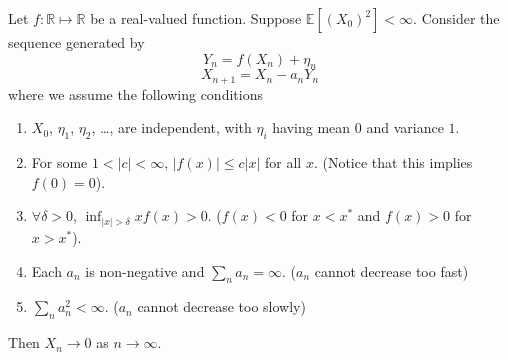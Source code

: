     \begin{theorem}\label{Thm:StochasticApproximation}
        Let $f: \mathbb{R} \mapsto \mathbb{R}$ be a real-valued function. Suppose $\mathbb{E}[(X_0)^2] < \infty$. Consider the sequence generated by
        \[ Y_n = f(X_n) + \eta_n \]
        \[ X_{n+1} = X_n - a_n Y_n \]
        where we assume the following conditions
        \begin{enumerate}
            \item $X_0$, $\eta_1$, $\eta_2$, \dots, are independent, with $\eta_i$ having mean $0$ and variance $1$.
            \item For some $1 < |c| < \infty$, $|f(x)| \le c|x|$ for all $x$. (Notice that this implies $f(0)=0$).
            \item $\forall \delta > 0$, $\inf_{|x|>\delta} xf(x) > 0$. ($f(x) < 0$ for $x < x^*$ and $f(x) > 0$ for $x>x^*$).
            \item Each $a_n$ is non-negative and $\sum_n a_n = \infty$. ($a_n$ cannot decrease too fast)
            \item $\sum_n a_n^2 < \infty$. ($a_n$ cannot decrease too slowly)
        \end{enumerate}

        Then $X_n \to 0$ as $n \to \infty$.
    \end{theorem}
